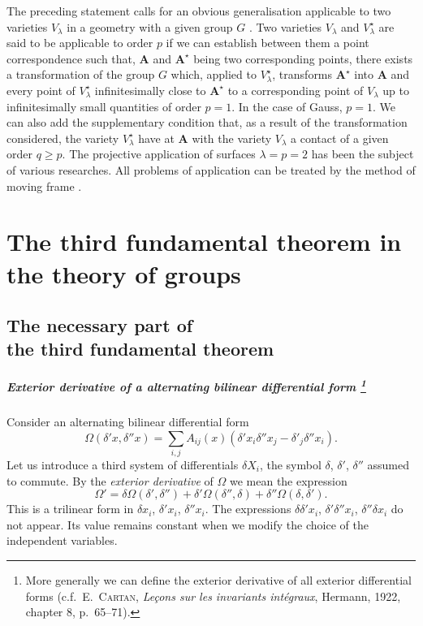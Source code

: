 \documentclass[leqno,11pt]{book}
\numberwithin{equation}{chapter}
\theoremstyle{shape1}
\theoremstyle{shapesmall}
\newcommand{\str}{^{\star}}
\begin{document}
The preceding statement calls for an obvious generalisation applicable to two varieties $V_{\lambda}$ in a geometry with a given group $G$ \cite{12}. Two varieties $V_{\lambda}$ and $V\str_{\lambda}$ are said to be applicable to order $p$ if we can establish between them a point correspondence such that, $\mathbf{A}$ and $\mathbf{A}\str$ being two corresponding points, there exists a transformation of the group $G$ which, applied to $V\str_{\lambda}$, transforms $\mathbf{A}\str$ into $\mathbf{A}$ and every point of $V\str_{\lambda}$ infinitesimally close to $\mathbf{A}\str$ to a corresponding point of $V_{\lambda}$ up to infinitesimally small quantities of order $p=1$. In the case of Gauss, $p=1$. We can also add the supplementary condition that, as a result of the transformation considered, the variety $V\str_{\lambda}$ have at $\mathbf{A}$ with the variety $V_{\lambda}$ a contact of a given order $q\ge p$. The projective application of surfaces $\lambda=p=2$ has been the subject of various researches. All problems of application can be treated by the method of moving frame \cite{20}.

\chapter{The third fundamental theorem in the theory of groups}
\label{cha:third-fund-theory}

\section[The necessary part of the third fundamental theorem]{The necessary part of\\ the third fundamental theorem}
\label{sec:direct-part-third}

\paragraph[{Exterior derivative of a alternating bilinear differential form.}]{Exterior derivative of a alternating bilinear differential form \footnote{More generally we can define the exterior derivative of all exterior differential forms (c.f.~\textsc{E.~Cartan}, \emph{Leçons sur les invariants intégraux}, Hermann, 1922, chapter 8, p.~65--71).}}
\label{sec:197}
Consider an alternating bilinear differential form
\begin{equation}
  \label{eq:13.1}
  \Omega(\delta'x,\delta''x)=\sum_{i,j}A_{ij}(x)(\delta' x_{i}\delta''x_{j}-\delta'_{j}\delta''x_{i}).
\end{equation}
Let us introduce a third system of differentials $\delta X_{i}$, the symbol $\delta$, $\delta'$, $\delta''$ assumed to commute. By the \emph{exterior derivative} of $\Omega$ we mean the expression
\begin{equation}
  \label{eq:13.2}
  \Omega'=\delta\Omega(\delta',\delta'')+\delta'\Omega(\delta'',\delta)+\delta''\Omega(\delta,\delta').
\end{equation}
This is a trilinear form in $\delta x_{i}$, $\delta' x_{i}$, $\delta'' x_{i}$. The expressions $\delta \delta'x_{i}$, $\delta'\delta''x_{i}$, $\delta''\delta x_{i}$ do not appear. Its value remains constant when we modify the choice of the independent variables.
\end{document}
